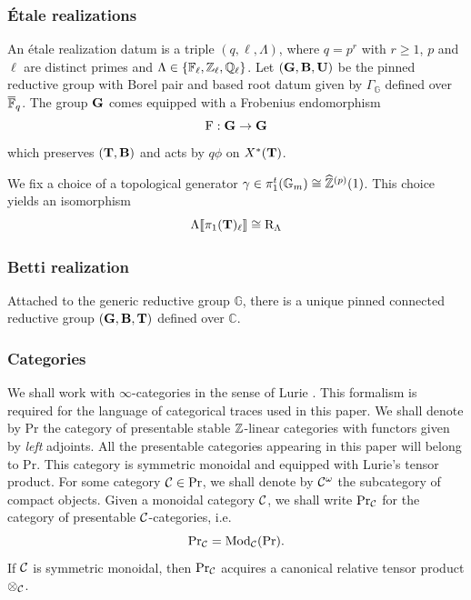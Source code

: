 \documentclass[a4paper, 10pt, oneside, reqno]{amsart}
\theoremstyle{plain}
\theoremstyle{definition}
\theoremstyle{remark}
\newcommand{\Gbb}{\mathbb{G}}
\newcommand{\RR}{\mathrm{R}}
\newcommand{\C}{\mathbb{C}}
\newcommand{\Prr}{\mathrm{Pr}}
\begin{document}
\subsubsection{\'{E}tale realizations}\label{ssec:etale-realization}

An étale realization datum is a triple $(q, \ell, \Lambda)$, where $q = p^r$ with $r \geq 1$, $p$ and $\ell$ are distinct primes and $\Lambda \in \{\mathbb{F}_{\ell}, \mathbb{Z}_{\ell}, \mathbb{Q}_{\ell}\}$. Let $(\mathbf{G}, \mathbf{B}, \mathbf{U})$ be the pinned reductive group with Borel pair and based root datum given by $\Gamma_{\Gbb}$ defined over $\overline{\mathbb{F}}_q$. The group $\mathbf{G}$ comes equipped with a Frobenius endomorphism 
$$\mathrm{F} : \mathbf{G} \to \mathbf{G}$$ 
which preserves $(\mathbf{T}, \mathbf{B})$ and acts by $q\phi$ on $X^*(\mathbf{T})$. 

We fix a choice of a topological generator $\gamma \in \pi_1^t(\mathbb{G}_m) \cong \widehat{\mathbb{Z}}^{(p)}(1)$. This choice yields an isomorphism 
\begin{equation}\label{eq:trivialization-pi-1}
\Lambda\llbracket \pi_1(\Tbf)_{\ell} \rrbracket \cong \RR_{\Lambda}
\end{equation}

\subsubsection{Betti realization}\label{ssec:betti-realization}

Attached to the generic reductive group $\Gbb$, there is a unique pinned connected reductive group $(\mathbf{G}, \mathbf{B}, \mathbf{T})$ defined over $\C$. 


\subsubsection{Categories}

We shall work with $\infty$-categories in the sense of Lurie \cite{HTT,HA}. This formalism is required for the language of categorical traces used in this paper. We shall denote by $\Prr$ the category of presentable stable $\mathbb{Z}$-linear categories with functors given by \emph{left} adjoints. All the presentable categories appearing in this paper will belong to $\Prr$. This category is symmetric monoidal and equipped with Lurie's tensor product. For some category $\Ccal \in \Prr$, we shall denote by $\mathcal{C}^{\omega}$ the subcategory of compact objects. Given a monoidal category $\mathcal{C}$, we shall write $\Prr_{\Ccal}$ for the category of presentable $\mathcal{C}$-categories, i.e.
$$\Prr_{\Ccal} = \Mod_{\Ccal}(\Prr).$$
If $\mathcal{C}$ is symmetric monoidal, then $\Prr_{\Ccal}$ acquires a canonical relative tensor product $\otimes_{\mathcal{C}}$. 
\end{document}
